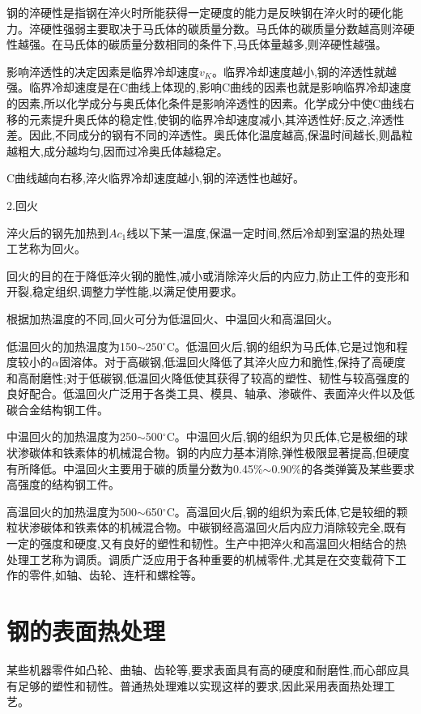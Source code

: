 \documentclass[UTF8]{ctexbook}
\newcommand{\◎}{\ensuremath{\bigcirc}}
\begin{document}
钢的淬硬性是指钢在淬火时所能获得一定硬度的能力是反映钢在淬火时的硬化能力。淬硬性强弱主要取决于马氏体的碳质量分数。马氏体的碳质量分数越高则淬硬性越强。在马氏体的碳质量分数相同的条件下,马氏体量越多,则淬硬性越强。

影响淬透性的决定因素是临界冷却速度$v_K$。临界冷却速度越小,钢的淬透性就越强。临界冷却速度是在C曲线上体现的,影响C曲线的因素也就是影响临界冷却速度的因素,所以化学成分与奥氏体化条件是影响淬透性的因素。化学成分中使C曲线右移的元素提升奥氏体的稳定性,使钢的临界冷却速度减小,其淬透性好;反之,淬透性差。因此,不同成分的钢有不同的淬透性。奥氏体化温度越高,保温时间越长,则晶粒越粗大,成分越均匀,因而过冷奥氏体越稳定。

C曲线越向右移,淬火临界冷却速度越小,钢的淬透性也越好。

2.回火

淬火后的钢先加热到$Ac_1$线以下某一温度,保温一定时间,然后冷却到室温的热处理工艺称为回火。

回火的目的在于降低淬火钢的脆性,减小或消除淬火后的内应力,防止工件的变形和开裂,稳定组织,调整力学性能,以满足使用要求。

根据加热温度的不同,回火可分为低温回火、中温回火和高温回火。

低温回火的加热温度为150$\sim$250$^\circ$C。低温回火后,钢的组织为马氏体,它是过饱和程度较小的$\alpha$固溶体。对于高碳钢,低温回火降低了其淬火应力和脆性,保持了高硬度和高耐磨性;对于低碳钢,低温回火降低使其获得了较高的塑性、韧性与较高强度的良好配合。低温回火广泛用于各类工具、模具、轴承、渗碳件、表面淬火件以及低碳合金结构钢工件。

中温回火的加热温度为250$\sim$500$^\circ$C。中温回火后,钢的组织为贝氏体,它是极细的球状渗碳体和铁素体的机械混合物。钢的内应力基本消除,弹性极限显著提高,但硬度有所降低。中温回火主要用于碳的质量分数为0.45\%$\sim$0.90\%的各类弹簧及某些要求高强度的结构钢工件。

高温回火的加热温度为500$\sim$650$^\circ$C。高温回火后,钢的组织为索氏体,它是较细的颗粒状渗碳体和铁素体的机械混合物。中碳钢经高温回火后内应力消除较完全,既有一定的强度和硬度,又有良好的塑性和韧性。生产中把淬火和高温回火相结合的热处理工艺称为调质。调质广泛应用于各种重要的机械零件,尤其是在交变载荷下工作的零件,如轴、齿轮、连杆和螺栓等。

\section{钢的表面热处理}

某些机器零件如凸轮、曲轴、齿轮等,要求表面具有高的硬度和耐磨性,而心部应具有足够的塑性和韧性。普通热处理难以实现这样的要求,因此采用表面热处理工艺。
\end{document}
